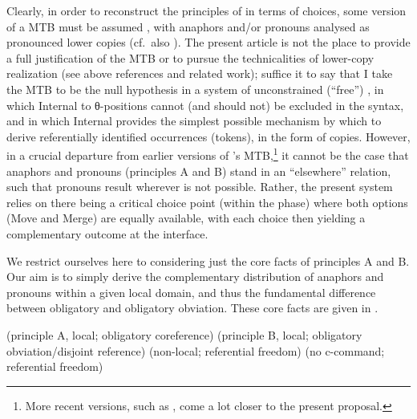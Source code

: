 \documentclass[output=paper]{langsci/langscibook}
\begin{document}
Clearly, in order to reconstruct the principles of  in terms of 
choices, some version of a \gls{MTB} must be assumed
\parencite{Hornstein2001,Hornstein2009,Hornstein2013,Kayne2002,Abe2014}, with
anaphors and/or pronouns analysed as pronounced lower copies (cf.\ also
\citealt{Heinat2003}).  The present article is not the place to provide a full
justification of the \gls{MTB} or to pursue the technicalities of lower-copy
realization (see above references and related work); suffice it to say that I
take the \gls{MTB} to be the null hypothesis in a system of unconstrained
(\enquote{free}) , in which Internal  to θ-positions cannot
(and should not) be excluded in the syntax, and in which Internal 
provides the simplest possible mechanism by which to derive referentially
identified occurrences (tokens), in the form of copies. However, in a crucial
departure from earlier versions of \citeauthor{Hornstein2001}’s
\gls{MTB},\footnote{More recent versions, such as \textcite{Hornstein2013},
    come a lot closer to the present proposal.} it cannot be the case that
    anaphors and pronouns (principles A and B) stand in an \enquote{elsewhere}
    relation, such that pronouns result wherever
     is not possible.  Rather, the present system relies on there being
    a critical choice point (within the phase) where both options (Move and
    Merge) are equally available, with each choice then yielding a
    complementary outcome at the interface.

We restrict ourselves here to considering just the core facts of
principles A and B. Our aim is to simply derive the complementary
distribution of anaphors and pronouns within a given local domain, and thus the
fundamental difference between obligatory  and obligatory
obviation. These core facts are given in .

\ea\label{ex:22.9}
    \ea\label{ex:22.9a} %
        \phantom{He thinks that Mary likes him\qquad}%
        (principle A, local; obligatory \hphantom{He thinks that Mary likes
        him\qquad} coreference)
    \ex\label{ex:22.9b} %
        \phantom{He thinks that Mary likes him\qquad}%
        (principle B, local; obligatory \hphantom{He thinks that Mary likes
        him\qquad} obviation/disjoint reference)
    \ex\label{ex:22.9c} %
        \phantom{He thinks that Mary likes him\qquad}%
        (non-local; referential freedom)
    \ex\label{ex:22.9d} %
        \phantom{He thinks that Mary likes him\qquad}%
        (no c-command; referential \hphantom{He thinks that Mary likes
        him\qquad} freedom)
    \z
\z
\end{document}
